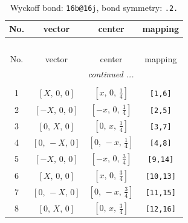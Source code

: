 \documentclass[fleqn,8pt]{jsarticle}
\begin{document}
\begin{longtable}{cccc}
\caption{Wyckoff bond: {\tt 16b@16j}, bond symmetry: {\tt .2.}}
 \\
 \hline \hline
No. & vector & center & mapping \\ \hline \endfirsthead

\multicolumn{3}{l}{\tablename\ \thetable{}} \\
 \hline \hline
No. & vector & center & mapping \\ \hline \endhead

 \hline \hline
\multicolumn{3}{r}{\footnotesize\it continued ...} \\ \endfoot

 \hline \hline
\multicolumn{3}{r}{} \\ \endlastfoot

1 & $\left[ X,\, 0,\, 0 \right]$ & $\left[ x,\, 0,\, \frac{1}{4} \right]$ & {\tt [1,6]} \\ \hline
2 & $\left[ - X,\, 0,\, 0 \right]$ & $\left[ - x,\, 0,\, \frac{1}{4} \right]$ & {\tt [2,5]} \\ \hline
3 & $\left[ 0,\, X,\, 0 \right]$ & $\left[ 0,\, x,\, \frac{1}{4} \right]$ & {\tt [3,7]} \\ \hline
4 & $\left[ 0,\, - X,\, 0 \right]$ & $\left[ 0,\, - x,\, \frac{1}{4} \right]$ & {\tt [4,8]} \\ \hline
5 & $\left[ - X,\, 0,\, 0 \right]$ & $\left[ - x,\, 0,\, \frac{3}{4} \right]$ & {\tt [9,14]} \\ \hline
6 & $\left[ X,\, 0,\, 0 \right]$ & $\left[ x,\, 0,\, \frac{3}{4} \right]$ & {\tt [10,13]} \\ \hline
7 & $\left[ 0,\, - X,\, 0 \right]$ & $\left[ 0,\, - x,\, \frac{3}{4} \right]$ & {\tt [11,15]} \\ \hline
8 & $\left[ 0,\, X,\, 0 \right]$ & $\left[ 0,\, x,\, \frac{3}{4} \right]$ & {\tt [12,16]} \\
\end{longtable}
\renewcommand{\arraystretch}{1.2}
\end{document}
